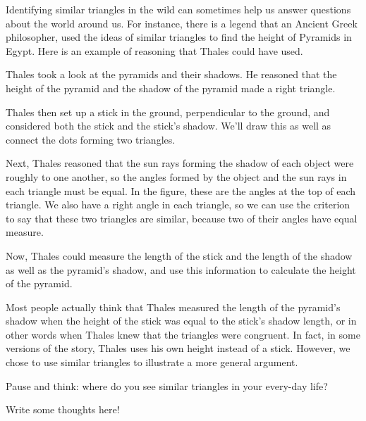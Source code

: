 \documentclass{ximera}
\begin{document}
Identifying similar triangles in the wild can sometimes help us answer questions about the world around us. For instance, there is a legend that an Ancient Greek philosopher,  used the ideas of similar triangles to find the height of Pyramids in Egypt. Here is an example of reasoning that Thales could have used.
\begin{example}
Thales took a look at the pyramids and their shadows. He reasoned that the height of the pyramid and the shadow of the pyramid made a right triangle.
\begin{image}
\end{image}
Thales then set up a stick in the ground, perpendicular to the ground, and considered both the stick and the stick's shadow. We'll draw this as well as connect the dots forming two triangles.
\begin{image}
\end{image}
Next, Thales reasoned that the sun rays forming the shadow of each object were roughly  to one another, so the angles formed by the object and the sun rays in each triangle must be equal. In the figure, these are the angles at the top of each triangle. We also have a right angle in each triangle, so we can use the  criterion to say that these two triangles are similar, because two of their angles have equal measure.

Now, Thales could measure the length of the stick and the length of the shadow as well as the pyramid's shadow, and use this information to calculate the height of the pyramid.

\end{example}
Most people actually think that Thales measured the length of the pyramid's shadow when the height of the stick was equal to the stick's shadow length, or in other words when Thales knew that the triangles were congruent. In fact, in some versions of the story, Thales uses his own height instead of a stick. However, we chose to use similar triangles to illustrate a more general argument.

\begin{question}
Pause and think: where do you see similar triangles in your every-day life?
\begin{freeResponse}
Write some thoughts here!
\end{freeResponse}
\end{question}
\end{document}
